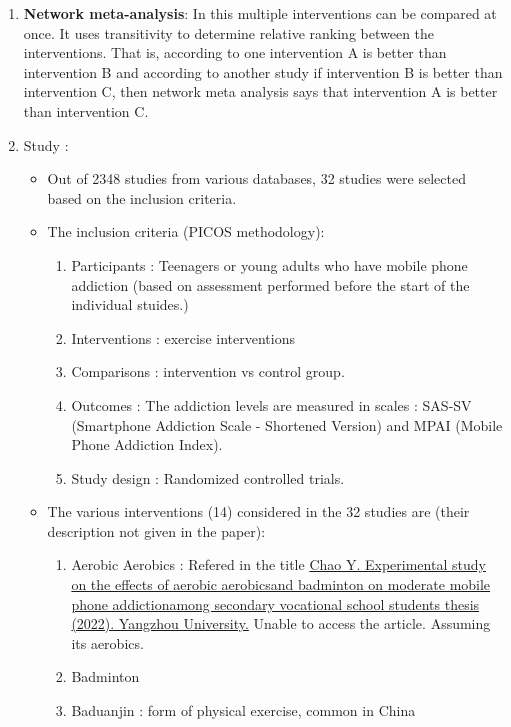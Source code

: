 \documentclass{article}
\begin{document}
\begin{enumerate}
    \item \textbf{Network meta-analysis}: In this multiple interventions can be compared at once. It uses transitivity to determine relative ranking between the interventions. 
    That is, according to one intervention A is better than intervention B and according to another study if intervention B is better than intervention C, then network meta analysis says that intervention A is better than intervention C.
    \cite{pmc2017networkmeta} \cite{sciencedirect2024nma} \cite{cochrane2023nma}
    \item Study : 
    \begin{itemize}
        \item Out of 2348 studies from various databases, 32 studies were selected based on the inclusion criteria.
        \item The inclusion criteria (PICOS methodology):
        \begin{enumerate}
            \item Participants : Teenagers or young adults who have mobile phone addiction (based on assessment performed before the start of the individual stuides.)
            \item Interventions : exercise interventions
            \item Comparisons : intervention vs control group.
            \item Outcomes : The addiction levels are measured in scales : SAS-SV (Smartphone Addiction Scale - Shortened Version) and MPAI (Mobile Phone Addiction Index).
            \item Study design : Randomized controlled trials.
        \end{enumerate}
        \item The various interventions (14) considered in the 32 studies are (their description not given in the paper): 
        \begin{enumerate}
            \item Aerobic Aerobics : Refered in the title \href{https://doi.org/10.27441/d.cnki.gyzdu.2022.000378}{Chao Y. Experimental study on the effects of aerobic aerobicsand badminton on
                moderate mobile phone addictionamong secondary vocational school students thesis
                (2022). Yangzhou University.} Unable to access the article. Assuming its aerobics.
            \item Badminton
            \item Baduanjin : form of physical exercise, common in China

\end{enumerate}
\end{itemize}
\end{enumerate}
\end{document}
